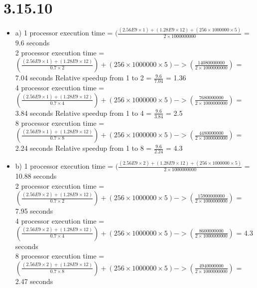 \documentclass{article}
\begin{document}
\section{3.15.10}
\begin{itemize}
    \item a) 1 processor execution time = $(\frac{(2.56E9 \times 1) + (1.28E9 \times 12) + (256 \times 1000000 \times 5)}{2 \times 1000000000}$ = 9.6 seconds\newline
    \ \\
    2 processor execution time = $(\frac{(2.56E9 \times 1) + (1.28E9 \times 12)}{0.7 \times 2}) + (256 \times 1000000 \times 5) -> (\frac{14080000000}{2 \times 1000000000})$ = 7.04 seconds\newline
    Relative speedup from 1 to 2 = $\frac{9.6}{7.04}$ = 1.36\newline
    \ \\
    4 processor execution time = $(\frac{(2.56E9 \times 1) + (1.28E9 \times 12)}{0.7 \times 4}) + (256 \times 1000000 \times 5) -> (\frac{7680000000}{2 \times 1000000000})$ = 3.84 seconds\newline
    Relative speedup from 1 to 4 = $\frac{9.6}{3.84}$ = 2.5\newline
    \ \\
    8 processor execution time = $(\frac{(2.56E9 \times 1) + (1.28E9 \times 12)}{0.7 \times 8}) + (256 \times 1000000 \times 5) -> (\frac{4480000000}{2 \times 1000000000})$ = 2.24 seconds\newline
    Relative speedup from 1 to 8 = $\frac{9.6}{2.24}$ = 4.3\newline
    
    \item b) 1 processor execution time = $(\frac{(2.56E9 \times 2) + (1.28E9 \times 12) + (256 \times 1000000 \times 5)}{2 \times 1000000000}$ = 10.88 seconds\newline
    \ \\
    2 processor execution time = $(\frac{(2.56E9 \times 2) + (1.28E9 \times 12)}{0.7 \times 2}) + (256 \times 1000000 \times 5) -> (\frac{15900000000}{2 \times 1000000000})$ = 7.95 seconds\newline
    \ \\
    4 processor execution time = $(\frac{(2.56E9 \times 2) + (1.28E9 \times 12)}{0.7 \times 4}) + (256 \times 1000000 \times 5) -> (\frac{8600000000}{2 \times 1000000000})$ = 4.3 seconds\newline
    \ \\
    8 processor execution time = $(\frac{(2.56E9 \times 2) + (1.28E9 \times 12)}{0.7 \times 8}) + (256 \times 1000000 \times 5) -> (\frac{4940000000}{2 \times 1000000000})$ = 2.47 seconds\newline
    \ \\
    

\end{itemize}
\end{document}
